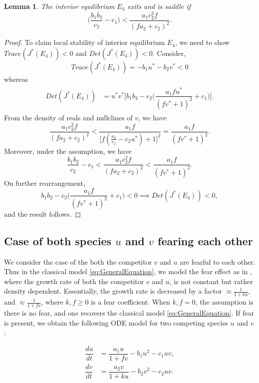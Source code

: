 \documentclass[10pt]{amsart}
\newtheorem{lemma}[theorem]{Lemma}
\theoremstyle{definition}
\begin{document}
\begin{lemma}\label{3eq5}
	The interior equilibrium $E_4$ exits and is saddle  if  
	\[\Big( \dfrac{b_1 b_2}{c_2} -c_1 \Big)< \dfrac{a_1 c_2^2 f}{(f a_2 +c_2)^2}.\]
\end{lemma}

\begin{proof}
	To claim local stability of interior equilibrium $E_4$, we need to show $Trace(J^*(E_4))<0$ and $Det(J^*(E_4))<0$. Consider,
	\[ Trace(J^*(E_4)) =  -b_1 u^* -b_2 v^*<0\]
	whereas
	\begin{align*}
		\begin{split}
			Det(J^*(E_4)) &= u^* v^* \Big[ b_1 b_2 - c_2 \Big( \dfrac{a_1 f u^*}{(f v^* +1)^2} + c_1 \Big)\Big].
		\end{split}
	\end{align*}
	From the density of reals and nullclines of $v$, we have
	\[ \dfrac{a_1 c_2^2 f}{(f a_2  + c_2)^2} < \dfrac{a_1 f}{\Big[ f (\frac{a_2}{c_2} - c_2 u^*) +1\Big]^2} = \dfrac{a_1 f}{(f v^*+1)^2}.\]
	Moreover, under the assumption, we have
	\[ \dfrac{b_1 b_2}{c_2} - c_1 < \dfrac{a_1 c_2^2 f}{(fa_2  + c_2)^2} < \dfrac{a_1 f}{(f v^* +1)^2}.\]
	On further rearrangement,
	\[ b_1b_2 - c_2 \Big( \dfrac{a_1 f}{(f v^* +1)^2} + c_1 \Big) <0 \implies  Det(J^*(E_4))<0,\]
	and the result follows.
\end{proof}

\subsection{Case of both species $u$ and $v$ fearing each other}
We consider the case of the both the competitor $v$ and $u$ are fearful to each other. Thus in the classical model \eqref{eq:GeneralEquation}, we model the fear effect as in \cite{Wang16}, where the growth rate of both the competitor $v$ and $u$, is not constant but rather density dependent. Essentially, the growth rate is decreased by a factor $\approx \frac{1}{1+k u}$, and $\approx \frac{1}{1+f v}$, where $k,f \geq 0$ is a fear coefficient. When $k,f=0$, the assumption is there is no fear, and one recovers the classical model \eqref{eq:GeneralEquation}. If fear is present, we obtain the following ODE model for two competing species $u$ and $v$: 



\begin{equation}\label{eq: Fearmodel1}
	\begin{split}
		\dfrac{du}{dt} &= \dfrac{a_1 u}{1+f v}-b_1 u^2 -c_1 uv, \\  
		\dfrac{dv}{dt}  &=  \dfrac{a_2 v}{1+k u}-b_2 v^2 -c_2 uv. \\
	\end{split}
\end{equation}
\end{document}
